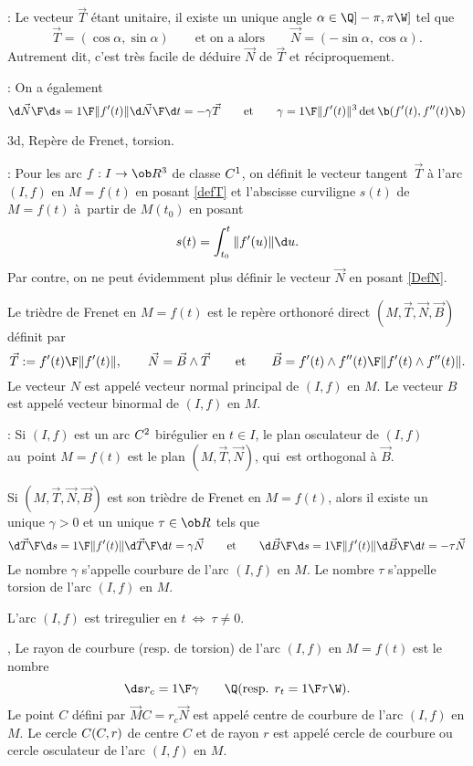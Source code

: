 \Remarque : Le vecteur $\vec T$ étant unitaire, il existe un unique angle $\alpha\in\Q]-\pi,\pi\W]$ tel que
$$
\vec T=(\cos\alpha,\sin\alpha)\qquad\mbox{et on a alors}\qquad\vec N=(-\sin\alpha,\cos\alpha). 
$$
Autrement dit, c'est très facile de déduire $\vec N$ de $\vec T$ et réciproquement. 
\bigskip

\Remarque : On a également 
$$
{\d \vec N\F\d s}={1\F\|f'(t)\|}{\d\vec N\F\d t}=-\gamma\vec T\qquad\mbox{et}\qquad 
\gamma={1\F\|f'(t)\|^3}\det\b(f'(t),f''(t)\b)
$$

\Subsection 3d, Repère de Frenet, torsion.
\bigskip

\Remarque : Pour les arc $f:I\to\ob R^3$ de classe $\sc C^1$, on définit le vecteur tangent~$\vec T$ à l'arc $(I,f)$ en $M=f(t)$ 
en posant \eqref{defT} et l'abscisse curviligne $s(t)$ de $M=f(t)$ à~partir de $M(t_0)$ en posant 
$$
s(t)=\int_{t_0}^t\|f'(u)\|\d u. 
$$
Par contre, on ne peut évidemment 
plus définir le vecteur $\vec N$ en posant \eqref{DefN}. 
\bigskip

Le trièdre de Frenet en $M=f(t)$ est le repère orthonoré direct 
$(M,\vec T,\vec N,\vec B)$ définit par 
$$
\vec T:={f'(t)\F\|f'(t)\|},\qquad \vec N=\vec B\wedge\vec T\qquad\mbox{et}\qquad
\vec B={f'(t)\wedge f''(t)\F\|f'(t)\wedge f''(t)\|}. 
$$ 
Le vecteur $N$ est appelé vecteur normal principal de $(I,f)$ en $M$. \pn
Le vecteur $B$ est appelé vecteur binormal de $(I,f)$ en $M$. 
\bigskip

\Remarque : Si $(I,f)$ est un arc $\sc C^2$ birégulier en $t\in I$, 
le plan osculateur de $(I,f)$ au~point $M=f(t)$ est le plan $(M,\vec T,\vec N)$, qui~est orthogonal à $\vec B$. 
\bigskip

Si $(M,\vec T,\vec N,\vec B)$ est son trièdre de Frenet en $M=f(t)$, alors il existe un unique
$\gamma>0$ et un unique $\tau\in\ob R$ tels que 
$$
{\d \vec T\F\d s}={1\F\|f'(t)\|}{\d\vec T\F\d t}=\gamma\vec N\qquad\mbox{et}
\qquad{\d \vec B\F\d s}={1\F\|f'(t)\|}{\d\vec B\F\d t}=-\tau\vec N
$$
Le nombre $\gamma$ s'appelle courbure de l'arc $(I,f)$ en $M$. \pn
Le nombre $\tau$ s'appelle torsion de l'arc $(I,f)$ en $M$. 


L'arc $(I,f)$ est triregulier en $t\ \Longleftrightarrow\ \tau\neq0$. 

, 
Le rayon de courbure (resp. de torsion) de l'arc $(I,f)$ en $M=f(t)$ est le nombre 
$$
\ds r_c={1\F \gamma}\qquad\Q(\mbox{resp. } r_t={1\F\tau}\W).
$$ 
Le point $C$ défini par $\vec MC=r_c\vec N$ est appelé centre de courbure de l'arc $(I,f)$ en $M$. \pn
Le cercle $\sc C(C,r)$ de centre $C$ et de rayon $r$ est appelé cercle de courbure 
ou cercle osculateur de l'arc $(I,f)$ en $M$. 
\bigskip

